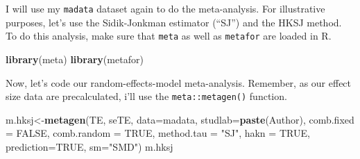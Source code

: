 \documentclass[]{book}
\newenvironment{Shaded}{\begin{snugshade}}{\end{snugshade}}
\newcommand{\KeywordTok}[1]{\textcolor[rgb]{0.13,0.29,0.53}{\textbf{#1}}}
\newcommand{\DataTypeTok}[1]{\textcolor[rgb]{0.13,0.29,0.53}{#1}}
\newcommand{\StringTok}[1]{\textcolor[rgb]{0.31,0.60,0.02}{#1}}
\newcommand{\OtherTok}[1]{\textcolor[rgb]{0.56,0.35,0.01}{#1}}
\newcommand{\NormalTok}[1]{#1}
\theoremstyle{definition}
\theoremstyle{definition}
\theoremstyle{definition}
\theoremstyle{remark}
\begin{document}
I will use my \texttt{madata} dataset again to do the meta-analysis. For
illustrative purposes, let's use the Sidik-Jonkman estimator (``SJ'')
and the HKSJ method. To do this analysis, make sure that \texttt{meta}
as well as \texttt{metafor} are loaded in R.

\begin{Shaded}
\begin{Highlighting}[]
\KeywordTok{library}\NormalTok{(meta)}
\KeywordTok{library}\NormalTok{(metafor)}
\end{Highlighting}
\end{Shaded}

Now, let's code our random-effects-model meta-analysis. Remember, as our
effect size data are precalculated, i'll use the
\texttt{meta::metagen()} function.

\begin{Shaded}
\begin{Highlighting}[]
\NormalTok{m.hksj<-}\KeywordTok{metagen}\NormalTok{(TE,}
\NormalTok{        seTE,}
        \DataTypeTok{data=}\NormalTok{madata,}
        \DataTypeTok{studlab=}\KeywordTok{paste}\NormalTok{(Author),}
        \DataTypeTok{comb.fixed =} \OtherTok{FALSE}\NormalTok{,}
        \DataTypeTok{comb.random =} \OtherTok{TRUE}\NormalTok{,}
        \DataTypeTok{method.tau =} \StringTok{"SJ"}\NormalTok{,}
        \DataTypeTok{hakn =} \OtherTok{TRUE}\NormalTok{,}
        \DataTypeTok{prediction=}\OtherTok{TRUE}\NormalTok{,}
        \DataTypeTok{sm=}\StringTok{"SMD"}\NormalTok{)}
\NormalTok{m.hksj}
\end{Highlighting}
\end{Shaded}
\end{document}
